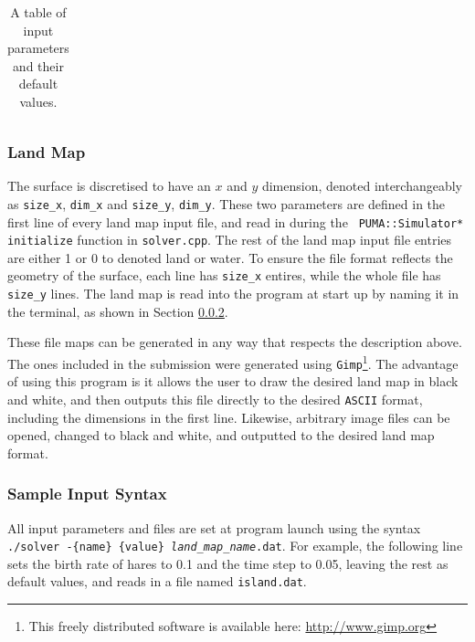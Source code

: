 \documentclass[a4paper,11pt]{article}
\begin{document}
{\begin{table}
\begin{tabular}{|l|l|l|l|}
\end{tabular}
\caption{A table of input parameters and their default values.}
\label{tb:parameters}
\end{table}


\subsubsection{Land Map}

The surface is discretised to have an $x$ and $y$ dimension, denoted interchangeably as \texttt{size\_x}, \texttt{dim\_x} and \texttt{size\_y}, \texttt{dim\_y}.  These two parameters are defined in the first line of every land map input file, and read in during the \texttt{ PUMA::Simulator* initialize} function in \texttt{solver.cpp}.  The rest of the land map input file entries are either 1 or 0 to denoted land or water.  To ensure the file format reflects the geometry of the surface, each line has \texttt{size\_x} entires, while the whole file has \texttt{size\_y} lines. The land map is read into the program at start up by naming it in the terminal, as shown in Section \ref{syntax}.

These file maps can be generated in any way that respects the description above.  The ones included in the submission were generated using \texttt{Gimp}\footnote{This freely distributed software is available here: \url{http://www.gimp.org}}.  The advantage of using this program is it allows the user to draw the desired land map in black and white, and then outputs this file directly to the desired \texttt{ASCII} format, including the dimensions in the first line.  Likewise, arbitrary image files can be opened, changed to black and white, and outputted to the desired land map format.

  

\subsubsection{Sample Input Syntax}\label{syntax}

All input parameters and files are set at program launch using the syntax \texttt{./solver -\{name\} \{value\} \emph{land\_map\_name}.dat}.  For example, the following line sets the birth rate of hares to 0.1 and the time step to 0.05, leaving the rest as default values, and reads in a file named \texttt{island.dat}.

}
\end{document}
